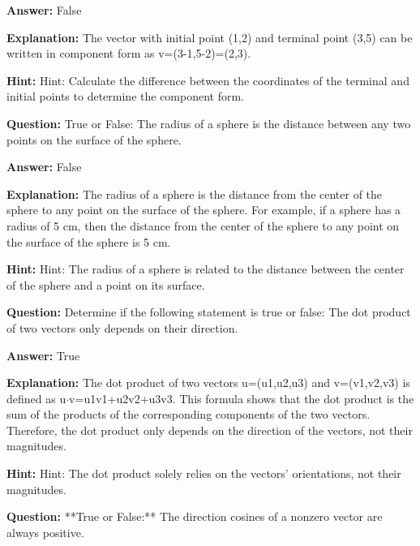 \documentclass{article}
\begin{document}
                \textbf{Answer:} False
                
                \textbf{Explanation:} The vector with initial point (1,2) and terminal point (3,5) can be written in component form as v=(3-1,5-2)=(2,3).
                
                \textbf{Hint:} Hint: Calculate the difference between the coordinates of the terminal and initial points to determine the component form.
                \vspace{0.5cm} 
        
            
                \textbf {Question:} True or False: The radius of a sphere is the distance between any two points on the surface of the sphere.
                
                \textbf{Answer:} False
                
                \textbf{Explanation:} The radius of a sphere is the distance from the center of the sphere to any point on the surface of the sphere.  For example, if a sphere has a radius of 5 cm, then the distance from the center of the sphere to any point on the surface of the sphere is 5 cm.
                
                \textbf{Hint:} Hint: The radius of a sphere is related to the distance between the center of the sphere and a point on its surface.
                \vspace{0.5cm} 
        
            
                \textbf {Question:} Determine if the following statement is true or false:
                The dot product of two vectors only depends on their direction.
                
                \textbf{Answer:} True
                
                \textbf{Explanation:} The dot product of two vectors u=(u1,u2,u3) and v=(v1,v2,v3) is defined as u$\cdot$v=u1v1+u2v2+u3v3. This formula shows that the dot product is the sum of the products of the corresponding components of the two vectors. Therefore, the dot product only depends on the direction of the vectors, not their magnitudes.
                
                \textbf{Hint:} Hint: The dot product solely relies on the vectors' orientations, not their magnitudes.
                \vspace{0.5cm} 
        
            
                \textbf {Question:} **True or False:** The direction cosines of a nonzero vector are always positive.
                
\end{document}
